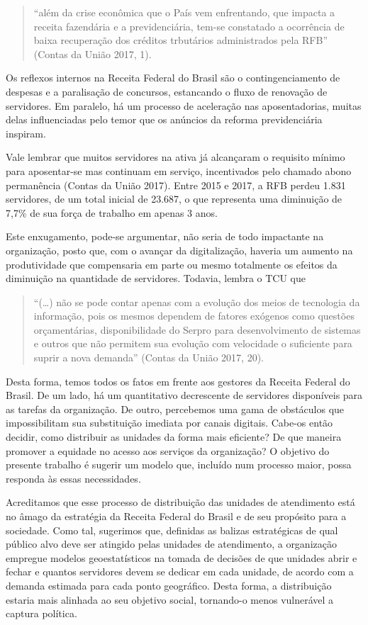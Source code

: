 \documentclass[]{article}
\begin{document}
\begin{quote}
``além da crise econômica que o País vem enfrentando, que impacta a
receita fazendária e a previdenciária, tem-se constatado a ocorrência de
baixa recuperação dos créditos trbutários administrados pela RFB''
(Contas da União 2017, 1).
\end{quote}

Os reflexos internos na Receita Federal do Brasil são o
contingenciamento de despesas e a paralisação de concursos, estancando o
fluxo de renovação de servidores. Em paralelo, há um processo de
aceleração nas aposentadorias, muitas delas influenciadas pelo temor que
os anúncios da reforma previdenciária inspiram.

Vale lembrar que muitos servidores na ativa já alcançaram o requisito
mínimo para aposentar-se mas continuam em serviço, incentivados pelo
chamado abono permanência (Contas da União 2017). Entre 2015 e 2017, a
RFB perdeu 1.831 servidores, de um total inicial de 23.687, o que
representa uma diminuição de 7,7\% de sua força de trabalho em apenas 3
anos.

Este enxugamento, pode-se argumentar, não seria de todo impactante na
organização, posto que, com o avançar da digitalização, haveria um
aumento na produtividade que compensaria em parte ou mesmo totalmente os
efeitos da diminuição na quantidade de servidores. Todavia, lembra o TCU
que

\begin{quote}
``(\ldots{}) não se pode contar apenas com a evolução dos meios de
tecnologia da informação, pois os mesmos dependem de fatores exógenos
como questões orçamentárias, disponibilidade do Serpro para
desenvolvimento de sistemas e outros que não permitem sua evolução com
velocidade o suficiente para suprir a nova demanda'' (Contas da União
2017, 20).
\end{quote}

Desta forma, temos todos os fatos em frente aos gestores da Receita
Federal do Brasil. De um lado, há um quantitativo decrescente de
servidores disponíveis para as tarefas da organização. De outro,
percebemos uma gama de obstáculos que impossibilitam sua substituição
imediata por canais digitais. Cabe-os então decidir, como distribuir as
unidades da forma mais eficiente? De que maneira promover a equidade no
acesso aos serviços da organização? O objetivo do presente trabalho é
sugerir um modelo que, incluído num processo maior, possa responda às
essas necessidades.

Acreditamos que esse processo de distribuição das unidades de
atendimento está no âmago da estratégia da Receita Federal do Brasil e
de seu propósito para a sociedade. Como tal, sugerimos que, definidas as
balizas estratégicas de qual público alvo deve ser atingido pelas
unidades de atendimento, a organização empregue modelos geoestatísticos
na tomada de decisões de que unidades abrir e fechar e quantos
servidores devem se dedicar em cada unidade, de acordo com a demanda
estimada para cada ponto geográfico. Desta forma, a distribuição estaria
mais alinhada ao seu objetivo social, tornando-o menos vulnerável a
captura política.
\end{document}
